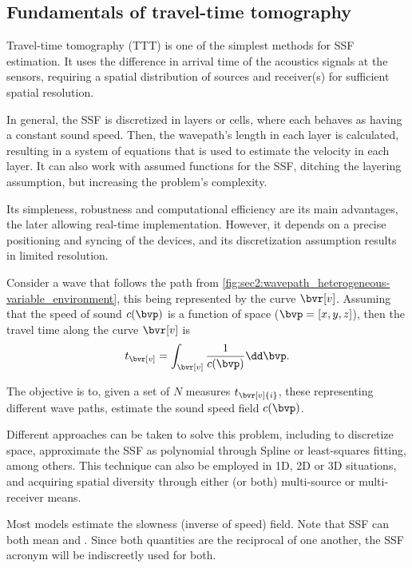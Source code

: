 \subsection{Fundamentals of travel-time tomography}

Travel-time tomography (TTT) \cite{bormann_seismic_2012,stefanov_travel_2019} is one of the simplest methods for SSF estimation. It uses the difference in arrival time of the acoustics signals at the sensors, requiring a spatial distribution of sources and receiver(s) for sufficient spatial resolution.

In general, the SSF is discretized in layers or cells, where each behaves as having a constant sound speed. Then, the wavepath's length in each layer is calculated, resulting in a system of equations that is used to estimate the velocity in each layer. It can also work with assumed functions for the SSF, ditching the layering assumption, but increasing the problem's complexity.

Its simpleness, robustness and computational efficiency are its main advantages, the later allowing real-time implementation. However, it depends on a precise positioning and syncing of the devices, and its discretization assumption results in limited resolution.



Consider a wave that follows the path from \cref{fig:sec2:wavepath_heterogeneous-variable_environment}, this being represented by the curve $\bvr[v]$. Assuming that the speed of sound $c(\bvp)$ is a function of space ($\bvp = [x,y,z]$), then the travel time along the curve $\bvr[v]$ is
\begin{equation}
	t_{\bvr[v]} = \int_{\bvr[v]} \frac{1}{c(\bvp)} \dd\bvp.
\end{equation}

The objective is to, given a set of $N$ measures $t_{\bvr[v]{i}}$, these representing different wave paths, estimate the sound speed field $c(\bvp)$.

Different approaches can be taken to solve this problem, including to discretize space, approximate the SSF as polynomial through Spline or least-squares fitting, among others. This technique can also be employed in 1D, 2D or 3D situations, and acquiring spatial diversity through either (or both) multi-source or multi-receiver means.

Most models estimate the slowness (inverse of speed) field. Note that SSF can both mean  and . Since both quantities are the reciprocal of one another, the SSF acronym will be indiscreetly used for both.

